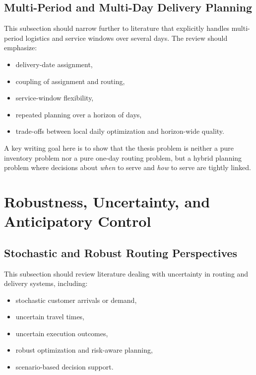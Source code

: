 \subsection{Multi-Period and Multi-Day Delivery Planning}

This subsection should narrow further to literature that explicitly handles multi-period logistics and service windows over several days. The review should emphasize:

\begin{itemize}
    \item delivery-date assignment,
    \item coupling of assignment and routing,
    \item service-window flexibility,
    \item repeated planning over a horizon of days,
    \item trade-offs between local daily optimization and horizon-wide quality.
\end{itemize}

A key writing goal here is to show that the thesis problem is neither a pure inventory problem nor a pure one-day routing problem, but a hybrid planning problem where decisions about \emph{when} to serve and \emph{how} to serve are tightly linked.

\section{Robustness, Uncertainty, and Anticipatory Control}

\subsection{Stochastic and Robust Routing Perspectives}

This subsection should review literature dealing with uncertainty in routing and delivery systems, including:

\begin{itemize}
    \item stochastic customer arrivals or demand,
    \item uncertain travel times,
    \item uncertain execution outcomes,
    \item robust optimization and risk-aware planning,
    \item scenario-based decision support.
\end{itemize}

